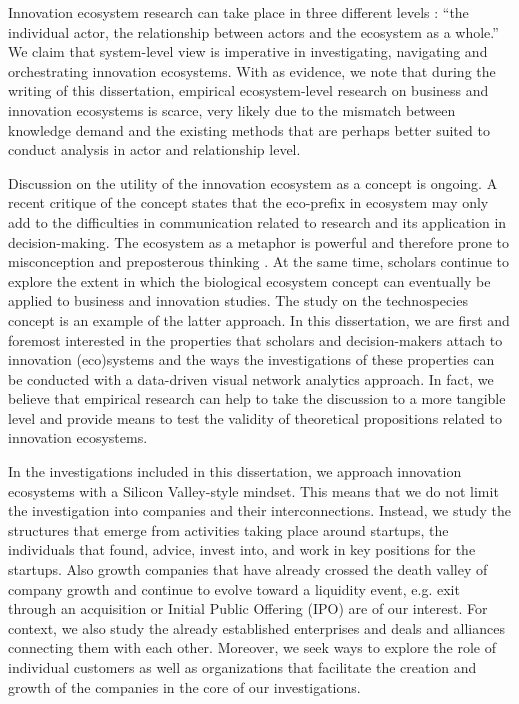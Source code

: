Innovation ecosystem research can take place in three different levels \citep{Jarvi2016TakingReview}: ``the individual actor, the relationship between actors and the ecosystem as a whole.'' We claim that system-level view is imperative in investigating, navigating and orchestrating innovation ecosystems. With \cite{Jarvi2016TakingReview} as evidence, we note that during the writing of this dissertation, empirical ecosystem-level research on business and innovation ecosystems is scarce, very likely due to the mismatch between knowledge demand and the existing methods that are perhaps better suited to conduct analysis in actor and relationship level.

Discussion on the utility of the innovation ecosystem as a concept is ongoing. A recent critique of the concept \citep{OhInnovationExamination} states that the eco-prefix in ecosystem may only add to the difficulties in communication related to research and its application in decision-making. The ecosystem as a metaphor is powerful and therefore prone to misconception and preposterous thinking \citep{OhInnovationExamination}. At the same time, scholars continue to explore the extent in which the biological ecosystem concept can eventually be applied to business and innovation studies. The study on the technospecies concept \citep{Weber2015WhoConcept} is an example of the latter approach. In this dissertation, we are first and foremost interested in the properties that scholars and decision-makers attach to innovation (eco)systems and the ways the investigations of these properties can be conducted with a data-driven visual network analytics approach. In fact, we believe that empirical research can help to take the discussion to a more tangible level and provide means to test the validity of theoretical propositions related to innovation ecosystems. 

In the investigations included in this dissertation, we approach innovation ecosystems with a Silicon Valley-style mindset. This means that we do not limit the investigation into companies and their interconnections. Instead, we study the structures that emerge from activities taking place around startups, the individuals that found, advice, invest into, and work in key positions for the startups. Also growth companies that have already crossed the death valley of company growth and continue to evolve toward a liquidity event, e.g. exit through an acquisition or Initial Public Offering (IPO) are of our interest. For context, we also study the already established enterprises and deals and alliances connecting them with each other. Moreover, we seek ways to explore the role of individual customers as well as organizations that facilitate the creation and growth of the companies in the core of our investigations.

